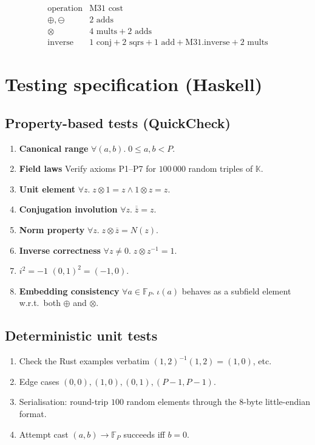 \documentclass{article}
\begin{document}
\[
\begin{array}{l|c}
\text{operation} & \text{M31 cost} \\ \hline
\oplus,\ominus & 2\text{ adds} \\
\otimes & 4 \text{ mults} + 2 \text{ adds} \\
\text{inverse} & 1\text{ conj} + 2\text{ sqrs} + 1\text{ add}
                 + \text{M31.inverse} + 2\text{ mults}
\end{array}
\]

\section{Testing specification (Haskell)}

\subsection{Property-based tests (QuickCheck)}

\begin{enumerate}[label=\textbf{Q\arabic*}.]
\item \textbf{Canonical range}  
      \(\forall(a,b).\;0\le a,b < P\).
\item \textbf{Field laws}  
      Verify axioms P1–P7 for \(100\,000\) random triples of \(\mathbb{K}\).
\item \textbf{Unit element}  
      \(\forall z.\; z\otimes 1 = z \land 1\otimes z = z\).
\item \textbf{Conjugation involution}  
      \(\forall z.\;\overline{\overline{z}}=z\).
\item \textbf{Norm property}  
      \(\forall z.\;z\otimes\overline{z} = N(z)\).
\item \textbf{Inverse correctness}  
      \(\forall z\neq0.\;z\otimes z^{-1}=1\).
\item \textbf{$i^{2}=-1$}  
      \((0,1)^{2}=(-1,0)\).
\item \textbf{Embedding consistency}  
      \(\forall a\in\mathbb{F}_{P}.\;\iota(a)\) behaves
      as a subfield element w.r.t.\ both \(\oplus\) and \(\otimes\).
\end{enumerate}

\subsection{Deterministic unit tests}

\begin{enumerate}[label=\textbf{T\arabic*}.]
\item Check the Rust examples verbatim  
      \( (1,2)^{-1}(1,2)= (1,0)\), etc.
\item Edge cases \((0,0),(1,0),(0,1),(P\!-\!1,P\!-\!1)\).
\item Serialisation: round-trip
      \(100\) random elements through the 8-byte
      little-endian format.
\item Attempt cast \((a,b)\to\mathbb{F}_{P}\) succeeds
      iff \(b=0\).
\end{enumerate}
\end{document}
